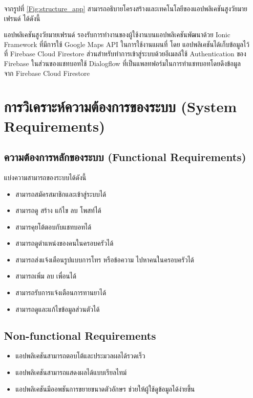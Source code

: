 จากรูปที่ \ref{Fig:structure_app} สามารถอธิบายโครงสร้างและเทคโนโลยีของแอปพลิเคชันสูงวัยมายเฟรนด์ ได้ดังนี้


แอปพลิเคชันสูงวัยมายเฟรนด์ รองรับการทำงานของผู้ใช้งานบนแอปพลิเคชันพัฒนาด้วย Ionic Framework ที่มีการใช้ Google Maps API ในการใช้งานแผนที่ โดย
แอปพลิเคชันได้เก็บข้อมูลไว้ที่ Firebase Cloud Firestore ส่วนสำหรับทำการเข้าสู่ระบบด้วยอีเมลล์ใช้ Authentication ของ Firebase ในส่วนของแชทบอทใช้ 
Dialogflow ที่เป็นแพลทฟอร์มในการทำแชทบอทโดยดึงข้อมูลจาก Firebase Cloud Firestore

\section{การวิเคราะห์ความต้องการของระบบ (System Requirements)}

\subsection{ความต้องการหลักของระบบ (Functional Requirements)}
	แบ่งความสามารถของระบบได้ดังนี้
		\begin{itemize}[label={--}]
			\item สามารถสมัครสมาชิกและเข้าสู่ระบบได้
			\item สามารถดู สร้าง แก้ไข ลบ โพสท์ได้
			\item สามารคุยโต้ตอบกับแชทบอทได้
			\item สามารถดูตำแหน่งของคนในครอบครัวได้
			\item สามารถส่งแจ้งเตือนรูปแบบการโทร หรือข้อความ ไปหาคนในครอบครัวได้
			\item สามารถเพิ่ม ลบ เพื่อนได้
			\item สามารถรับการแจ้งเตือนการทานยาได้
			\item สามารถดูและแก้ไขข้อมูลส่วนตัวได้
		\end{itemize}

\subsection{Non-functional Requirements}
		\begin{itemize}[label={--}]
			\item แอปพลิเคชันสามารถตอบโต้และประมวลผลได้รวดเร็ว
			\item แอปพลิเคชันสามารถแสดงผลได้แบบเรียลไทม์
			\item แอปพลิเคชันมีออพชันการขยายขนาดตัวอักษร ช่วยให้ผู้ใช้ดูข้อมูลได้ง่ายขึ้น
		\end{itemize}
	
